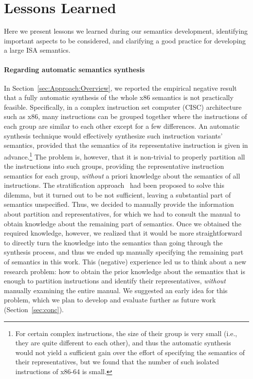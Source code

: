 \section{Lessons Learned}
\label{sec:lesson-learned}

{\color{blue}

Here we present lessons we learned during our semantics development, identifying important aspects to be considered, and clarifying a good practice for developing a large ISA semantics.

\paragraph{Regarding automatic semantics synthesis}

In Section~\ref{sec:Approach:Overview}, we reported the empirical negative result that a fully automatic synthesis of the whole x86 semantics is not practically feasible.
Specifically, in a complex instruction set computer (CISC) architecture such as x86, many instructions can be grouped together where the instructions of each group are similar to each other except for a few differences.
An automatic synthesis technique would effectively synthesize such instruction variants' semantics, provided that the semantics of its representative instruction is given in advance.\footnote{%
For certain complex instructions, the size of their group is very small (i.e., they are quite different to each other), and thus the automatic synthesis would not yield a sufficient gain over the effort of specifying the semantics of their representatives, but we found that the number of such isolated instructions of x86-64 is small.}
The problem is, however, that it is non-trivial to properly partition all the instructions into such groups, providing the representative instruction semantics for each group, \emph{without} a priori knowledge about the semantics of all instructions.
The stratification approach~\cite{Heule2016a} had been proposed to solve this dilemma, but it turned out to be not sufficient, leaving a substantial part of semantics unspecified.
Thus, we decided to manually provide the information about partition and representatives, for which we had to consult the manual to obtain knowledge about the remaining part of semantics.
Once we obtained the required knowledge, however, we realized that it would be more straightforward to directly turn the knowledge into the semantics than going through the synthesis process, and thus we ended up manually specifying the remaining part of semantics in this work.
%
This (negative) experience led us to think about a new research problem: how to obtain the prior knowledge about the semantics that is enough to partition instructions and identify their representatives, \emph{without} manually examining the entire manual.
We suggested an early idea for this problem, which we plan to develop and evaluate further as future work (Section~\ref{sec:conc}).

}

